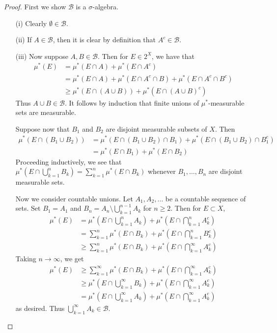 \documentclass[11pt]{amsart}
\theoremstyle{definition}
\numberwithin{equation}{section}
\begin{document}
\begin{proof}
    First we show $\mathcal B$ is a $\sigma$-algebra.
    \begin{enumerate}
        \item [(i)] Clearly $\emptyset\in \mathcal B$.
        \item [(ii)] If $A\in \mathcal B$, then it is clear by definition that $A^c\in\mathcal B$.
        \item [(iii)] Now suppose $A,B\in\mathcal B$. Then for $E\in 2^X$, we have that
        \begin{align*}
            \mu^*(E)&=\mu^*(E\cap A)+\mu^*(E\cap A^c)\\
            &=\mu^*(E\cap A)+\mu^*(E\cap A^c\cap B)+\mu^*(E\cap A^c\cap B^c)\\
            &\ge\mu^*(E\cap (A\cup B))+\mu^*(E\cap (A\cup B)^c)
        \end{align*}
        Thus $A\cup B\in\mathcal B$. It follows by induction that finite unions of $\mu^*$-measurable sets are measurable.

        Suppose now that $B_1$ and $B_2$ are disjoint measurable subsets of $X$. Then
        \begin{align*}
            \mu^*(E\cap(B_1\cup B_2))&=\mu^*(E\cap (B_1\cup B_2)\cap B_1)+\mu^*(E\cap (B_1\cup B_2)\cap B_1^c)\\
            &=\mu^*(E\cap B_1)+\mu^*(E\cap B_2)
        \end{align*}
        Proceeding inductively, we see that $\mu^*(E\cap \bigcup_{k=1}^nB_k)=\sum_{k=1}^n\mu^*(E\cap B_k)$ whenever $B_1,\ldots,B_n$ are disjoint measurable sets.

        Now we consider countable unions. Let $A_1,A_2,\ldots$ be a countable sequence of sets. Set $B_1=A_1$ and $B_n=A_n\setminus \bigcup_{k=1}^{n-1}A_k$ for $n\ge 2$. Then for $E\subset X$,
        \begin{align*}
            \mu^*(E)&=\mu^*(E\cap \bigcup_{k=1}^nA_k)+\mu^*(E\cap \bigcap_{k=1}^nA_k^c)\\
            &=\sum_{k=1}^n\mu^*(E\cap B_k)+\mu^*(E\cap \bigcap_{k=1}^nB_k^c)\\
            &\ge\sum_{k=1}^n\mu^*(E\cap B_k)+\mu^*(E\cap \bigcap_{k=1}^\infty A_k^c)
        \end{align*}
        Taking $n\to\infty$, we get
        \begin{align*}
            \mu^*(E)&\ge\sum_{k=1}^\infty\mu^*(E\cap B_k)+\mu^*(E\cap\bigcap_{k=1}^\infty A_k^c)\\
            &\ge\mu^*(E\cap\bigcup_{k=1}^\infty B_k)+\mu^*(E\cap\bigcap_{k=1}^\infty A_k^c)\\
            &=\mu^*(E\cap\bigcup_{k=1}^\infty A_k)+\mu^*(E\cap\bigcap_{k=1}^\infty A_k^c)
        \end{align*}
        as desired. Thus $\bigcup_{k=1}^\infty A_k\in\mathcal B$.


\end{enumerate}
\end{proof}
\end{document}
